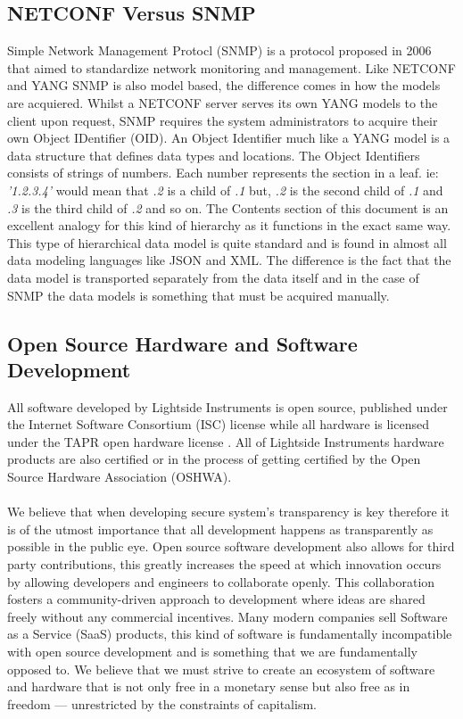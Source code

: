 \documentclass[12pt]{article}
\begin{document}
\subsection{NETCONF Versus SNMP}
Simple Network Management Protocl (SNMP) \cite{schonwalderSimpleNetworkManagement2006} is a protocol proposed in 2006 that aimed 
to standardize network monitoring and management. Like NETCONF and YANG SNMP is also model based, the difference comes in how the models are acquiered.
Whilst a NETCONF server serves its own YANG models to the client upon request, SNMP requires the system administrators to acquire their own Object IDentifier (OID).
An Object Identifier much like a YANG model is a data structure that defines data types and locations. The Object Identifiers consists of strings of numbers.
Each number represents the section in a leaf. ie: \textit{'1.2.3.4'} would mean that \textit{.2} is a child of \textit{.1} but, \textit{.2} is the second child of \textit{.1} and \textit{.3} 
is the third child of \textit{.2} and so on. The Contents section of this document is an excellent analogy for this kind of hierarchy as it functions in the 
exact same way.
This type of hierarchical data model is quite standard and is found in almost all data modeling languages like JSON and XML. The difference is the fact that the data model 
is transported separately from the data itself and in the case of SNMP the data models is something that must be acquired manually.


\subsection{Open Source Hardware and Software Development}
All software developed by Lightside Instruments is open source, published under 
the Internet Software Consortium (ISC) license \cite{consortiumISCOpenSource2024} while 
all hardware is licensed under the TAPR open hardware license \cite{TAPROpenHardware}. 
All of Lightside Instruments hardware products are also certified or in the 
process of getting certified by the Open Source Hardware Association (OSHWA).
\\
\\
We believe that when developing secure system's transparency is key therefore it is of the 
utmost importance that all development happens as transparently as possible in the public eye.
Open source software development also allows for third party contributions, this greatly 
increases the speed at which innovation occurs by allowing developers and engineers to collaborate openly. 
This collaboration fosters a community-driven approach to development where ideas are shared freely 
without any commercial incentives.
Many modern companies sell Software as a Service (SaaS) products, this kind of software is fundamentally 
incompatible with open source development and is something that we are fundamentally opposed to.
We believe that we must strive to create an ecosystem of software and hardware that is not only free in a
monetary sense but also free as in freedom — unrestricted by the constraints of capitalism.
\end{document}
